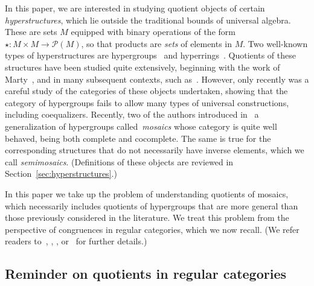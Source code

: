 \documentclass[reqno]{amsart}
\renewcommand{\P}{\mathcal{P}}
\numberwithin{equation}{section}
\theoremstyle{plain}
\theoremstyle{definition}
\begin{document}
In this paper, we are interested in studying quotient objects of certain \emph{hyperstructures}, which lie outside the traditional bounds of universal algebra. These are sets $M$ equipped with binary operations of the form $\star \colon M \times M \to \P(M)$, so that products are \emph{sets} of elements in $M$. Two well-known types of hyperstructures are hypergroups~\cite{Marty} and hyperrings~\cite{Krasner}. Quotients of these structures have been studied quite extensively, beginning with the work of Marty~\cite{Marty:quotients}, and in many subsequent contexts, such as~\cite{Krasner:quotient, Jantosciak, FZ}.
However, only recently was a careful study of the categories of these objects undertaken, showing that the category of hypergroups fails to allow many types of universal constructions, including coequalizers.
Recently, two of the authors introduced in~\cite{NakamuraReyes} a generalization of hypergroups called~\emph{mosaics} whose category is quite well behaved, being both complete and cocomplete. The same is true for the corresponding structures that do not necessarily have inverse elements, which we call \emph{semimosaics}. (Definitions of these objects are reviewed in Section~\ref{sec:hyperstructures}.)

In this paper we take up the problem of understanding quotients of mosaics, which necessarily includes quotients of hypergroups that are more general than those previously considered in the literature.
We treat this problem from the perspective of congruences in regular categories, which we now recall. (We refer readers  to~\cite{Grillet:regular}, \cite[Chapter~2]{Borceux:handbook2}, \cite[Appendix~A5]{BorceuxBorn}, or~\cite{BournGran} for further details.)


\subsection{Reminder on quotients in regular categories}\label{subsection:regularcat}
\end{document}
